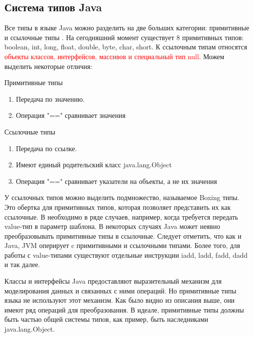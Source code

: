 \subsection{Система типов Java}
Все типы в языке Java можно разделить на две больших категории: примитивные и ссылочные типы \cite{java-spec}. На сегодняшний момент существует 8 примитивных типов: boolean, int,
long, float, double, byte, char, short. К ссылочным типам относятся \textcolor{red}{объекты классов, интерфейсов, массивов и специальный тип null}. Можем выделить некоторые отличия:
\par
Примитивные типы
\begin{enumerate}
	\item Передача по значению.
	\item Операция "==" сравнивает значения 
\end{enumerate}
Ссылочные типы
\begin{enumerate}
	\item Передача по ссылке.
	\item Имеют единый родительский класс java.lang.Object
	\item Операция "==" сравнивает указатели на объекты, а не их значения
\end{enumerate}
У ссылочных типов можно выделить подмножество, называемое Boxing типы. Это обертка для примитивных типов, которая позволяет представить их как ссылочные. В необходимо в ряде случаев, например, когда требуется передать value-тип в параметр шаблона. В некоторых случаях Java может неявно преобразовывать примитивные типы в ссылочные.
Следует отметить, что как и Java, JVM оперирует c примитивными и ссылочными типами\cite{jvm-spec}. Более того, для работы с value-типами существуют отдельные инструкции iadd, ladd, fadd, dadd и так далее.
\par
Классы и интерфейсы Java предоставляют выразительный механизм для моделирования данных и связанных с ними операций. Но примитивные типы языка не используют этот механизм.
Как было видно из описания выше, они имеют ряд операций для преобразования. В идеале, примитивные типы должны быть частью общей системы типов, как пример, быть наследниками java.lang.Object.

